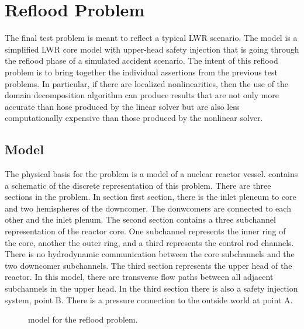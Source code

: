 \section{Reflood Problem}
\label{sect:refloodProblem}

The final test problem is meant to reflect a typical LWR scenario.
The model is a simplified LWR core model with upper-head safety injection that is going through the reflood phase of a simulated accident scenario.
The intent of this reflood problem is to bring together the individual assertions from the previous test problems.
In particular, if there are localized nonlinearities, then the use of the domain decomposition algorithm can produce results that are not only more accurate than hose produced by the linear solver but are also less computationally expensive than those produced by the nonlinear solver.

\subsection{Model}
\label{sect:refloodModel}

The physical basis for the problem is a model of a nuclear reactor vessel.
 contains a schematic of the discrete representation of this problem.
There are three sections in the problem.
In section first section, there is the inlet pleneum to core and two hemispheres of the downcomer.
The donwcomers are connected to each other and the inlet plenum.
The second section contains a three subchannel representation of the reactor core.
One subchannel represents the inner ring of the core, another the outer ring, and a third represents the control rod channels.
There is no hydrodynamic communication between the core subchannels and the two downcomer subchannels.
The third section represents the upper head of the reactor.
In this model, there are transverse flow paths between all adjacent subchannels in the upper head.
In the third section there is also a safety injection system, point B.
There is a pressure connection to the outside world at point A.

\begin{figure}[h!t]
\centering

\caption{\cobra{} model for the reflood problem.}
\label{fig:refloodModel}
\end{figure}

